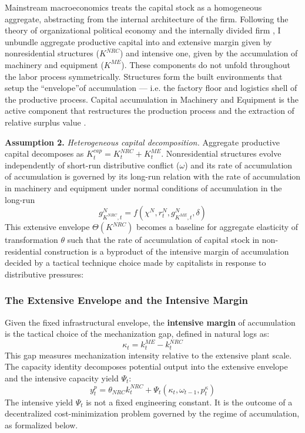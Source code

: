 Mainstream macroeconomics treats the capital stock as a
homogeneous aggregate, abstracting from the internal
architecture of the firm. Following the theory of organizational political economy and the internally divided firm \citep{Vidal2022}, I unbundle
aggregate productive capital into and extensive margin given by nonresidential
structures ($K^{NRC}$) and intensive one, given by the accumulation of machinery and equipment ($K^{ME}$).
These components do not unfold throughout the labor process
symmetrically. Structures form the built environments that setup the 
``envelope''of accumulation --- i.e. the factory floor and logistics shell of the productive process. Capital accumulation in Machinery and Equipment 
is the active component that restructures the production process and the extraction of 
relative surplus value \citep[Vol.~I, Ch.~15]{MarxKVI}.

\textbf{Assumption 2.} \textit{Heterogeneous capital
	decomposition.} Aggregate productive capital decomposes as
$K^{cap}_t = K^{NRC}_t + K^{ME}_t$. Nonresidential
structures evolve independently of short-run distributive
conflict ($\omega$) and its rate of accumulation of accumulation is governed by its long-run relation with the rate of accumulation in machinery and equipment under normal conditions of accumulation in the long-run 
\begin{equation}
	g_{K^{NRC}, t}^N = f(\chi^N,r^N_t,g_{K^{ME}, t}^N,\delta) 
	\label{eq:32:gKNRC}
\end{equation}
This extensive envelope $\Theta(K^{NRC})$ becomes a baseline for aggregate elasticity of transformation $\theta$ such that the rate of accumulation of capital stock in non-residential construction is a byproduct of the intensive margin of accumulation decided by a tactical technique choice made by capitalists in response to distributive pressures:

\subsubsection{The Extensive Envelope and the Intensive Margin}

Given the fixed infrastructural envelope, the
\textbf{intensive margin} of accumulation is the tactical
choice of the mechanization gap, defined in natural logs as:
\begin{equation}
	\kappa_t = k^{ME}_t - k^{NRC}_t
	\label{eq:32:kappa_def}
\end{equation}
This gap measures mechanization intensity relative to the
extensive plant scale. The capacity identity decomposes
potential output into the extensive envelope and the
intensive capacity yield $\Psi_t$:
\begin{equation}
	y^p_t = \theta_{NRC} k^{NRC}_t
	+ \Psi_t(\kappa_t, \omega_{t-1}, p^\kappa_t)
	\label{eq:32:capacity_decomp}
\end{equation}
The intensive yield $\Psi_t$ is not a fixed engineering
constant. It is the outcome of a decentralized
cost-minimization problem governed by the regime of
accumulation, as formalized below.

